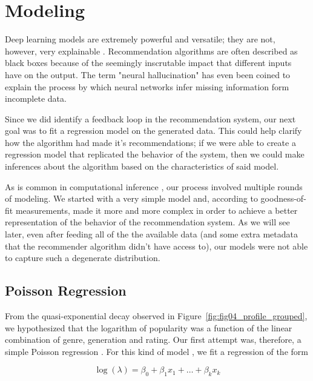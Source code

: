 \section{Modeling}
\label{sec:modeling04}

Deep learning models are extremely powerful and versatile; they are not,
however, very explainable \citep{}. Recommendation algorithms are often
described as black boxes \citep{} because of the seemingly inscrutable impact
that different inputs have on the output. The term "neural hallucination"
\citep{} has even been coined to explain the process by which neural networks
infer missing information form incomplete data.

Since we did identify a feedback loop in the recommendation system, our next
goal was to fit a regression model on the generated data. This could help
clarify how the algorithm had made it's recommendations; if we were able to
create a regression model that replicated the behavior of the system, then we
could make inferences about the algorithm based on the characteristics of said
model.


As is common in computational inference \citep{}, our process involved multiple
rounds of modeling. We started with a very simple model and, according to
goodness-of-fit measurements, made it more and more complex in order to achieve
a better representation of the behavior of the recommendation system. As we will
see later, even after feeding all of the the available data (and some extra
metadata that the recommender algorithm didn't have access to), our models were
not able to capture such a degenerate distribution.

\subsection{Poisson Regression}
\label{subsec:poisson04}

From the quasi-exponential decay observed in
Figure~\ref{fig:fig04_profile_grouped}, we hypothesized that the logarithm of
popularity was a function of the linear combination of genre, generation and
rating. Our first attempt was, therefore, a simple Poisson regression \citep{}.
For this kind of model \citep{}, we fit a regression of the form


$$
\log(\lambda) = \beta_0 + \beta_1 x_1 + \dots + \beta_k x_k
$$

